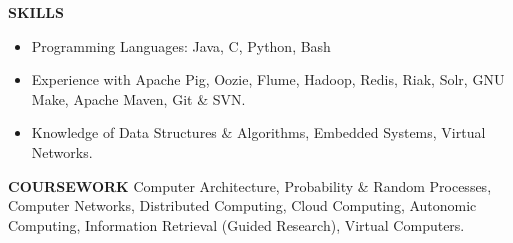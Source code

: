 \documentclass[10pt, letterpaper]{article}
\begin{document}

\textbf{SKILLS}
\smallskip 
\begin{itemize}
    \item Programming Languages: Java, C, Python, Bash
    \item Experience with Apache Pig, Oozie, Flume, Hadoop, Redis, Riak, Solr, GNU Make, Apache Maven, Git \& SVN.
    \item Knowledge of Data Structures \& Algorithms, Embedded Systems, Virtual Networks.
\end{itemize} 

\textbf{COURSEWORK}
\smallskip 
\newline
Computer Architecture, Probability \& Random Processes, Computer Networks, 
Distributed Computing, Cloud Computing, Autonomic Computing, Information Retrieval (Guided Research), Virtual Computers.
\end{document}
